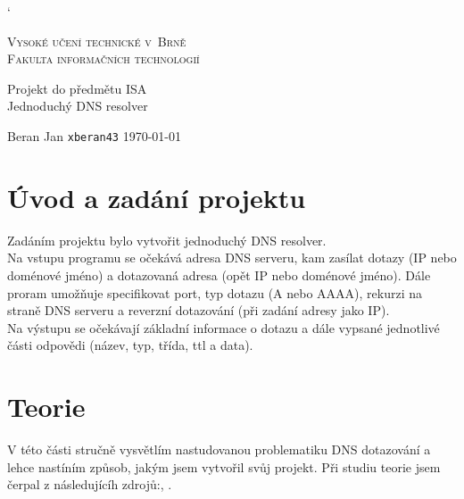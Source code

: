 \documentclass[a4paper, 11pt]{article}
\begin{document}
\catcode` %
\begin{titlepage}
	\begin{center}
		\Huge \textsc{Vysoké učení technické v~Brně}\\
		\huge \textsc{Fakulta informačních technologií}\\
		\begin{figure}[h]
		\begin{center}
		\end{center}
		\end{figure}

		\LARGE Projekt do předmětu ISA \\
		\Huge {Jednoduchý DNS resolver}\\
		
		
		\Large Beran Jan \texttt{xberan43}  \Large\today\\
	 \end{center}
\end{titlepage}
\tableofcontents

\newpage
\section{Úvod a zadání projektu}
Zadáním projektu bylo vytvořit jednoduchý DNS resolver.  \\
Na vstupu programu se očekává adresa DNS serveru, kam zasílat dotazy (IP nebo doménové jméno) a dotazovaná adresa (opět IP nebo doménové jméno). Dále proram umožňuje specifikovat port, typ dotazu (A nebo AAAA), rekurzi na straně DNS serveru a reverzní dotazování (při zadání adresy jako IP).  \\
Na výstupu se očekávají základní informace o dotazu a dále vypsané jednotlivé části odpovědi (název, typ, třída, ttl a data).

\section{Teorie}
V této části stručně vysvětlím nastudovanou problematiku DNS dotazování a lehce nastíním způsob, jakým jsem vytvořil svůj projekt. Při studiu teorie jsem čerpal z následujícíh zdrojů:\cite{Matousek:SAR}, \cite{DNS-notes}.
\end{document}
